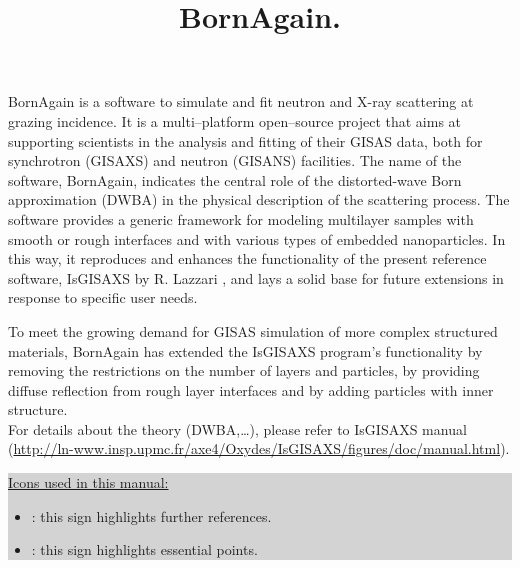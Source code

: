 \documentclass[a4paper,10pt]{report}
\title{BornAgain. }
\author{}
\newcommand\BackgroundPic{%
\put(0,0){%
\parbox[b][\paperheight]{\paperwidth}{%
\vfill
\centering
\texttt{[image: results2\_2.png]}%
\vfill
}}}
\begin{document}
\maketitle



\tableofcontents
\lstlistoflistings
\listoffigures
\listoftables

\newpage

BornAgain is a  software to simulate and fit neutron and X-ray
scattering at grazing incidence. It is a multi–platform open–source project that aims at supporting scientists in the analysis and fitting
of their GISAS data, both for synchrotron (GISAXS) and neutron (GISANS) facilities. The name of the software,
BornAgain, indicates the central role of the distorted-wave Born
approximation (DWBA) in the physical description of the
scattering process. The software provides a generic framework for modeling multilayer samples with smooth or
rough interfaces and with various types of embedded nanoparticles. In this way, it reproduces and enhances the
functionality of the present reference software, IsGISAXS by
R. Lazzari \cite{Lazzari:vi0158}, and lays a solid base for future
extensions in response to specific user needs. 

To meet the growing demand for GISAS simulation of more
complex structured materials, BornAgain has extended the IsGISAXS program’s functionality by removing the
restrictions on the number of layers and particles, by providing diffuse reflection from rough layer interfaces and
by adding particles with inner structure. \\


For details about the theory (DWBA,\ldots), please refer to IsGISAXS manual (\url{http://ln-www.insp.upmc.fr/axe4/Oxydes/IsGISAXS/figures/doc/manual.html}).\\


\colorbox{Lightgray}{\parbox{0.95\linewidth}
{
\noindent \underline{Icons used in this manual:}
\begin{itemize}
\item[] \smallpencil: this sign highlights further references.
\item[] {\huge\danger}: this sign highlights essential points.
\end{itemize}
}
}
\end{document}
